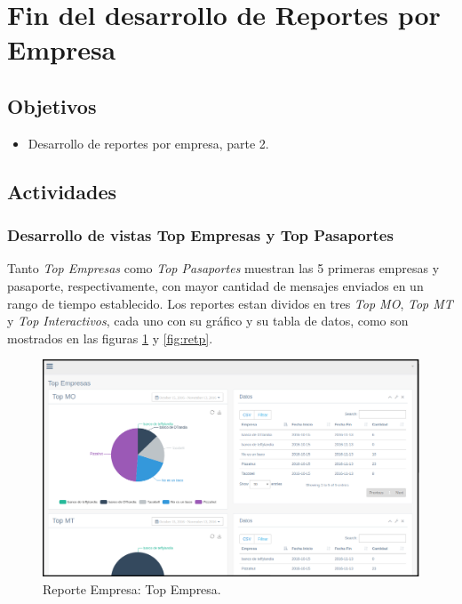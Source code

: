 
\section{Fin del desarrollo de Reportes por Empresa} \label{sect:Fin del desarrollo de Reportes por Empresa}

\subsection{Objetivos}
\begin{itemize}[noitemsep,nolistsep]
\item Desarrollo de reportes por empresa, parte 2. 
\end{itemize}

\subsection{Actividades}

\subsubsection{Desarrollo de vistas Top Empresas y Top Pasaportes}
\indent Tanto \textit{Top Empresas} como \textit{Top Pasaportes} muestran las 5 primeras empresas y pasaporte, respectivamente, con mayor cantidad de mensajes enviados en un rango de tiempo establecido. Los reportes estan dividos en tres \textit{Top MO}, \textit{Top MT} y \textit{Top Interactivos}, cada uno con su gráfico y su tabla de datos, como son mostrados en las figuras \ref{fig:rete} y \ref{fig:retp}.
\begin{figure}[ht]
  \centering
  \includegraphics[scale=0.30,type=png,ext=.png,read=.png]{imagenes/rete}
  \caption{Reporte Empresa: Top Empresa.}
  \label{fig:rete}
\end{figure}

